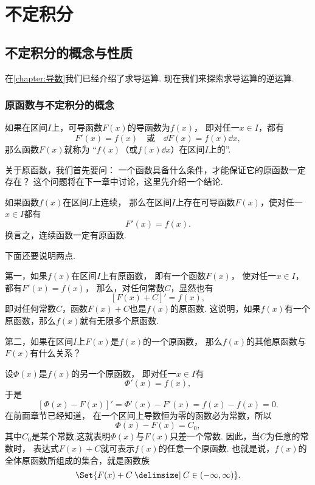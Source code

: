 \chapter{不定积分}\label{chapter:不定积分}
\section{不定积分的概念与性质}
在\cref{chapter:导数}我们已经介绍了求导运算.
现在我们来探索求导运算的逆运算.

\subsection{原函数与不定积分的概念}
\begin{definition}
如果在区间\(I\)上，可导函数\(F(x)\)的导函数为\(f(x)\)，
即对任一\(x \in I\)，都有\[
	F'(x)=f(x) \quad\text{或}\quad \dd{F(x)}=f(x) \dd{x},
\]
那么函数\(F(x)\)就称为
“\(f(x)\)（或\(f(x) \dd{x}\)）在区间\(I\)上的”.
\end{definition}

关于原函数，我们首先要问：
一个函数具备什么条件，才能保证它的原函数一定存在？
这个问题将在下一章中讨论，这里先介绍一个结论.
\begin{theorem}[原函数存在定理]%
如果函数\(f(x)\)在区间\(I\)上连续，
那么在区间\(I\)上存在可导函数\(F(x)\)，使对任一\(x \in I\)都有\[
	F'(x)=f(x).
\]
换言之，连续函数一定有原函数.
\end{theorem}
下面还要说明两点.

第一，如果\(f(x)\)在区间\(I\)上有原函数，
即有一个函数\(F(x)\)，
使对任一\(x \in I\)，
都有\(F'(x) = f(x)\)，
那么，对任何常数\(C\)，显然也有\[
	[F(x) + C]' = f(x),
\]即对任何常数\(C\)，函数\(F(x) + C\)也是\(f(x)\)的原函数.
这说明，如果\(f(x)\)有一个原函数，那么\(f(x)\)就有无限多个原函数.

第二，如果在区间\(I\)上\(F(x)\)是\(f(x)\)的一个原函数，
那么\(f(x)\)的其他原函数与\(F(x)\)有什么关系？

设\(\Phi(x)\)是\(f(x)\)的另一个原函数，
即对任一\(x \in I\)有\[
	\Phi'(x) = f(x),
\]
于是\[
	[\Phi(x) - F(x)]' = \Phi'(x) - F'(x) = f(x) - f(x) = 0.
\]
在前面章节已经知道，
在一个区间上导数恒为零的函数必为常数，所以\[
	\Phi(x) - F(x) = C_0,
\]
其中\(C_0\)是某个常数.这就表明\(\Phi(x)\)与\(F(x)\)只差一个常数.
因此，当\(C\)为任意的常数时，
表达式\(F(x) + C\)就可表示\(f(x)\)的任意一个原函数.
也就是说，\(f(x)\)的全体原函数所组成的集合，就是函数族\[
	\Set{ F(x) + C \given C \in (-\infty,\infty) }.
\]

